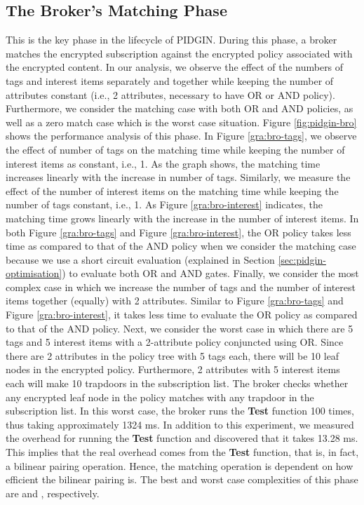 \documentclass[epsfig,a4paper,11pt,titlepage]{book}
\numberwithin{algorithm}{chapter}
\begin{document}
\subsection{The Broker's Matching Phase}
This is the key phase in the lifecycle of \gls{PIDGIN}. During this phase, a broker matches the encrypted subscription against the encrypted policy associated with the encrypted content. In our analysis, we observe the effect of the numbers of tags and interest items separately and together while keeping the number of attributes constant (i.e., 2 attributes, necessary to have OR or AND policy). Furthermore, we consider the matching case with both OR and AND policies, as well as a zero match case which is the worst case situation. Figure \ref{fig:pidgin-bro} shows the performance analysis of this phase. In Figure \ref{gra:bro-tags}, we observe the effect of number of tags on the matching time while keeping the number of interest items as constant, i.e., 1. As the graph shows, the matching time increases linearly with the increase in number of tags. Similarly, we measure the effect of the number of interest items on the matching time while keeping the number of tags constant, i.e., 1. As Figure \ref{gra:bro-interest} indicates, the matching time grows linearly with the increase in the number of interest items. In both Figure \ref{gra:bro-tags} and Figure \ref{gra:bro-interest}, the OR policy takes less time as compared to that of the AND policy when we consider the matching case because we use a short circuit evaluation (explained in Section \ref{sec:pidgin-optimisation}) to evaluate both OR and AND gates. Finally, we consider the most complex case in which we increase the number of tags and the number of interest items together (equally) with 2 attributes. Similar to Figure \ref{gra:bro-tags} and Figure \ref{gra:bro-interest}, it takes less time to evaluate the OR policy as compared to that of the AND policy. Next, we consider the worst case in which there are 5 tags and 5 interest items with a 2-attribute policy conjuncted using OR. Since there are 2 attributes in the policy tree with 5 tags each, there will be 10 leaf nodes in the encrypted policy. Furthermore, 2 attributes with 5 interest items each will make 10 trapdoors in the subscription list. The broker checks whether any encrypted leaf node in the policy matches with any trapdoor in the subscription list. In this worst case, the broker runs the \textbf{Test} function 100 times, thus taking approximately 1324 \gls{ms}. In addition to this experiment, we measured the overhead for running the \textbf{Test} function and discovered that it takes 13.28 \gls{ms}. This implies that the real overhead comes from the \textbf{Test} function, that is, in fact, a bilinear pairing operation. Hence, the matching operation is dependent on how efficient the bilinear pairing is. The best and worst case complexities of this phase are  and , respectively.
\end{document}
